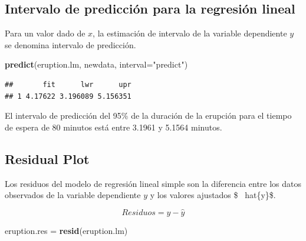 \documentclass[]{article}
\newenvironment{Shaded}{\begin{snugshade}}{\end{snugshade}}
\newcommand{\KeywordTok}[1]{\textcolor[rgb]{0.13,0.29,0.53}{\textbf{{#1}}}}
\newcommand{\DataTypeTok}[1]{\textcolor[rgb]{0.13,0.29,0.53}{{#1}}}
\newcommand{\DecValTok}[1]{\textcolor[rgb]{0.00,0.00,0.81}{{#1}}}
\newcommand{\StringTok}[1]{\textcolor[rgb]{0.31,0.60,0.02}{{#1}}}
\newcommand{\NormalTok}[1]{{#1}}
\numberwithin{equation}{section}
\begin{document}
\subsection{Intervalo de predicción para la regresión
lineal}\label{intervalo-de-prediccion-para-la-regresion-lineal}

Para un valor dado de \(x\), la estimación de intervalo de la variable
dependiente \(y\) se denomina intervalo de predicción.

\begin{Shaded}
\begin{Highlighting}[]
\KeywordTok{predict}\NormalTok{(eruption.lm, newdata, }\DataTypeTok{interval=}\StringTok{"predict"}\NormalTok{) }
\end{Highlighting}
\end{Shaded}

\begin{verbatim}
##       fit      lwr      upr
## 1 4.17622 3.196089 5.156351
\end{verbatim}

El intervalo de predicción del 95\% de la duración de la erupción para
el tiempo de espera de 80 minutos está entre 3.1961 y 5.1564 minutos.

\subsection{Residual Plot}\label{residual-plot}

Los residuos del modelo de regresión lineal simple son la diferencia
entre los datos observados de la variable dependiente \(y\) y los
valores ajustados \$ ~hat\{y\}\$.

\[
    Residuos = y -\hat{y}
\]

\begin{Shaded}
\begin{Highlighting}[]
\NormalTok{eruption.res =}\StringTok{ }\KeywordTok{resid}\NormalTok{(eruption.lm) }
\end{Highlighting}
\end{Shaded}

\begin{Shaded}
\end{Shaded}
\end{document}
